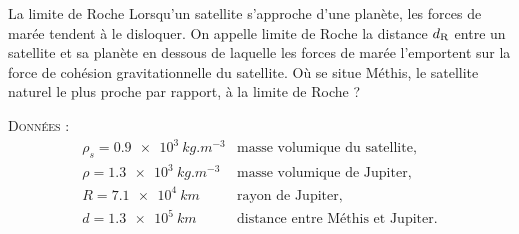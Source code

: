 \begin{exo}[PC][2][oral]{La limite de Roche}%
  Lorsqu'un satellite s'approche d'une planète, les forces de marée tendent à le disloquer. On appelle limite de Roche la distance $d_{\rm R}$ entre un satellite et sa planète en dessous de laquelle les forces de marée l'emportent sur la force de cohésion gravitationnelle du satellite. Où se situe Méthis, le satellite naturel le plus proche par rapport, à la limite de Roche ?

  \textsc{Données} : 
  $$\begin{array}{ll}
    \rho_s = \SI{0.9e3}{kg.m^{-3}} & \text{masse volumique du satellite}, \\
    \rho = \SI{1.3e3}{kg.m^{-3}} & \text{masse volumique de Jupiter}, \\
    R = \SI{7.1e4}{km} & \text{rayon de Jupiter}, \\
    d = \SI{1.3e5}{km} & \text{distance entre Méthis et Jupiter}.
  \end{array}$$
 
  
  
  \end{exo}


